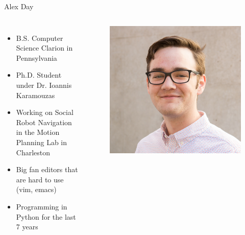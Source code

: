 \documentclass[aspectratio=169,xcolor=dvipsnames]{beamer}
\begin{document}
\begin{frame}{Alex Day}

  \begin{columns}[c]
    \begin{itemize}
        \item B.S. Computer Science Clarion in Pennsylvania
        \item Ph.D. Student under Dr. Ioannis Karamouzas
        \item Working on Social Robot Navigation in the Motion Planning Lab in Charleston
        \item Big fan editors that are hard to use (vim, emacs)
        \item Programming in Python for the last 7 years
    \end{itemize}

    \begin{figure}
        \includegraphics[width=1.0\textwidth]{profile.png}
    \end{figure}
  \end{columns}
\end{frame}

\end{document}
